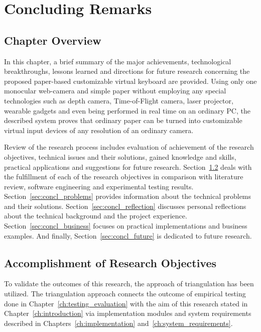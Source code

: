 \chapter{Concluding Remarks}
\label{ch:concluding_remarks}

\section{Chapter Overview}
\label{sec:concl_overview}
In this chapter, a brief summary of the major achievements, technological breakthroughs, lessons learned and directions for future research concerning the proposed paper-based customizable virtual keyboard are provided. Using only one monocular web-camera and simple paper without employing any special technologies such as depth camera, Time-of-Flight camera, laser projector, wearable gadgets and even being performed in real time on an ordinary PC, the described system proves that ordinary paper can be turned into customizable virtual input devices of any resolution of an ordinary camera.

Review of the research process includes evaluation of achievement of the research objectives, technical issues and their solutions, gained knowledge and skills, practical applications and suggestions for future research. Section~\ref{sec:concl_objectives} deals with the fulfillment of each of the research objectives in comparison with literature review, software engineering and experimental testing results. Section~\ref{sec:concl_problems} provides information about the technical problems and their solutions. Section~\ref{sec:concl_reflection} discusses personal reflections about the technical background and the project experience. Section~\ref{sec:concl_business} focuses on practical implementations and business examples. And finally, Section~\ref{sec:concl_future} is dedicated to future research.

\section{Accomplishment of Research Objectives}
\label{sec:concl_objectives}
To validate the outcomes of this research, the approach of triangulation has been utilized. The triangulation approach connects the outcome of empirical testing done in Chapter~\ref{ch:testing_evaluation} with the aim of this research stated in Chapter~\ref{ch:introduction} via implementation modules and system requirements described in Chapters~\ref{ch:implementation} and~\ref{ch:system_requirements}.

